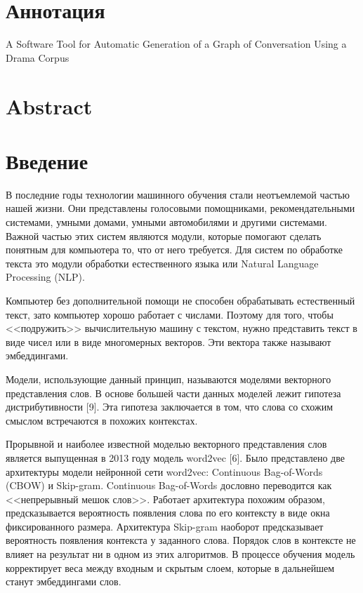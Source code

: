\documentclass[a4paper,14pt]{article}
\begin{document}
 	
	

	
\section*{\normalsize \hfill Аннотация \hfill}

\sloppy

\begin{center}
	A Software Tool for Automatic Generation of a Graph of Conversation Using a Drama Corpus
\end{center}
\section*{\normalsize \hfill Abstract \hfill}


\newpage

\tableofcontents
\pagebreak

\section*{Введение}


В последние годы технологии машинного обучения стали неотъемлемой частью нашей жизни. 
Они представлены голосовыми помощниками, рекомендательными системами, умными домами, умными автомобилями и другими системами.
Важной частью этих систем являются модули, которые помогают сделать понятным для компьютера то, что от него требуется.
Для систем по обработке текста это модули обработки естественного языка или Natural Language Processing (NLP).

Компьютер без дополнительной помощи не способен обрабатывать естественный текст, зато компьютер хорошо работает с числами.
Поэтому для того, чтобы <<подружить>> вычислительную машину с текстом, нужно представить текст в виде чисел или в виде многомерных векторов.
Эти вектора также называют эмбеддингами.

Модели, использующие данный принцип, называются моделями векторного представления слов.
В основе большей части данных моделей лежит гипотеза дистрибутивности [9].
Эта гипотеза заключается в том, что слова со схожим смыслом встречаются в похожих контекстах.

Прорывной и наиболее известной моделью векторного представления слов является выпущенная в 2013 году модель word2vec [6].
Было представлено две архитектуры модели нейронной сети word2vec: Continuous Bag-of-Words
(CBOW) и Skip-gram. 
Continuous Bag-of-Words дословно переводится как <<непрерывный мешок слов>>.
Работает архитектура похожим образом, предсказывается вероятность появления слова по его контексту в виде окна фиксированного размера.
Архитектура Skip-gram наоборот предсказывает вероятность появления контекста у заданного слова.
Порядок слов в контексте не влияет на результат ни в одном из этих алгоритмов.
В процессе обучения модель корректирует веса между входным и скрытым слоем, которые в дальнейшем станут эмбеддингами слов.
\end{document}

